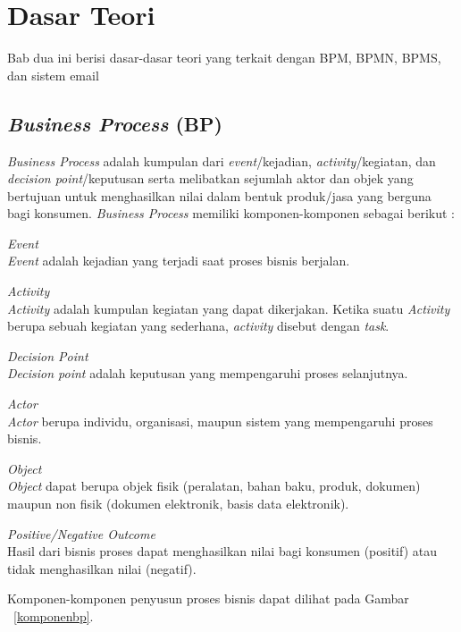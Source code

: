 \chapter{Dasar Teori}
\label{chap:teori}

Bab dua ini berisi dasar-dasar teori yang terkait dengan BPM, BPMN, BPMS, dan sistem email

\section{\textit{Business Process} (BP)}
\label{sec:bp}
\textit{Business Process} adalah kumpulan dari \textit{event}/kejadian, \textit{activity}/kegiatan, dan \textit{decision point}/keputusan serta melibatkan sejumlah aktor dan objek yang bertujuan untuk menghasilkan nilai dalam bentuk produk/jasa yang berguna bagi konsumen\cite{dumas:13}. \textit{Business Process} memiliki komponen-komponen sebagai berikut :
\begin{description}
	\item{\textit{Event}} \hfill \\\textit{Event} adalah kejadian yang terjadi saat proses bisnis berjalan. 
	\item{\textit{Activity}} \hfill \\\textit{Activity} adalah kumpulan kegiatan yang dapat dikerjakan. Ketika suatu \textit{Activity} berupa sebuah kegiatan yang sederhana, \textit{activity} disebut dengan \textit{task}. 
	\item{\textit{Decision Point}} \hfill \\\textit{Decision point} adalah keputusan yang mempengaruhi proses selanjutnya.
	\item{\textit{Actor}} \hfill \\ \textit{Actor} berupa individu, organisasi, maupun sistem yang mempengaruhi proses bisnis. 
	\item{\textit{Object}} \hfill \\ \textit{Object} dapat berupa objek fisik (peralatan, bahan baku, produk, dokumen) maupun non fisik (dokumen elektronik, basis data elektronik).
	\item{\textit{Positive/Negative Outcome}} \hfill \\ Hasil dari bisnis proses dapat menghasilkan nilai bagi konsumen (positif) atau tidak menghasilkan nilai (negatif).
\end{description}
Komponen-komponen penyusun proses bisnis dapat dilihat pada Gambar ~\ref{komponenbp}.
